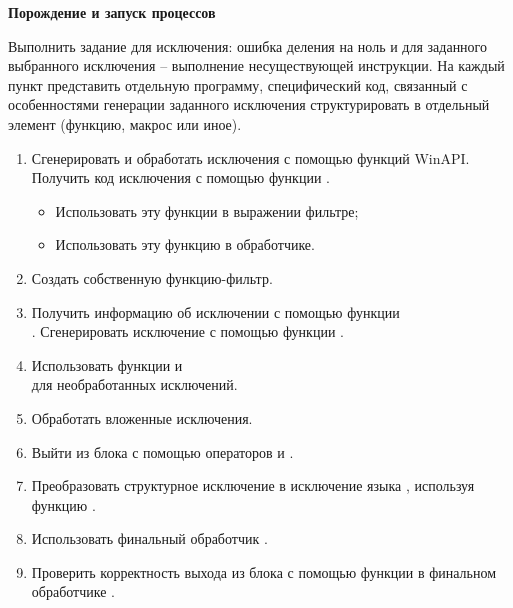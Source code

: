 \renewcommand{\labelenumii}{\theenumii}
\renewcommand{\theenumii}{\theenumi.\arabic{enumii}.}

\textbf{Порождение и запуск процессов}

Выполнить задание для исключения: ошибка деления на ноль и для заданного выбранного исключения -- выполнение несуществующей инструкции. На каждый пункт представить отдельную программу, специфический код, связанный с особенностями генерации заданного исключения структурировать в отдельный элемент (функцию, макрос или иное).

\begin{enumerate}
	\item Сгенерировать и обработать исключения с помощью функций WinAPI. Получить код исключения с помощью функции .
	\begin{itemize}
		\item Использовать эту функции в выражении фильтре;
		\item Использовать эту функцию в обработчике.
	\end{itemize}
	\item Создать собственную функцию-фильтр.
	\item Получить информацию об исключении с помощью функции \\ . Сгенерировать исключение с помощью функции .
	\item Использовать функции  и \\  для необработанных исключений.
	\item Обработать вложенные исключения.
	\item Выйти из блока  с помощью операторов  и .
	\item Преобразовать структурное исключение в исключение языка , используя функцию .
	\item Использовать финальный обработчик .
	\item Проверить корректность выхода из блока  с помощью функции  в финальном обработчике .
\end{enumerate}
